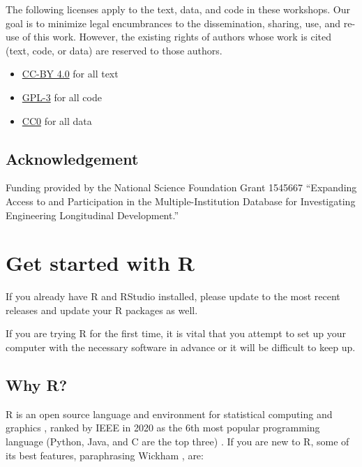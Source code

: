 \documentclass[
]{book}
\providecommand{\tightlist}{%
  \setlength{\itemsep}{0pt}\setlength{\parskip}{0pt}}
\begin{document}
The following licenses apply to the text, data, and code in these workshops. Our goal is to minimize legal encumbrances to the dissemination, sharing, use, and re-use of this work. However, the existing rights of authors whose work is cited (text, code, or data) are reserved to those authors.

\begin{itemize}
\tightlist
\item
  \href{https://creativecommons.org/licenses/by/4.0/legalcode}{CC-BY 4.0} for all text\\
\item
  \href{https://www.r-project.org/Licenses/GPL-3}{GPL-3} for all code\\
\item
  \href{https://wiki.creativecommons.org/wiki/CC0_use_for_data}{CC0} for all data
\end{itemize}

\hypertarget{acknowledgement}{%
\section*{Acknowledgement}\label{acknowledgement}}

Funding provided by the National Science Foundation Grant 1545667 ``Expanding Access to and Participation in the Multiple-Institution Database for Investigating Engineering Longitudinal Development.''

\hypertarget{get-start-r}{%
\chapter{Get started with R}\label{get-start-r}}

If you already have R and RStudio installed, please update to the most recent releases and update your R packages as well.

If you are trying R for the first time, it is vital that you attempt to set up your computer with the necessary software in advance or it will be difficult to keep up.

\hypertarget{why-r}{%
\section*{Why R?}\label{why-r}}

R is an open source language and environment for statistical computing and graphics \citep{R-base}, ranked by IEEE in 2020 as the 6th most popular programming language (Python, Java, and C are the top three) \citep{Cass:2020}. If you are new to R, some of its best features, paraphrasing Wickham \citeyearpar{wickham2014advanced}, are:
\end{document}
